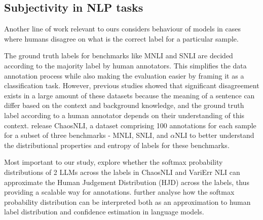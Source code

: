 

\subsection{Subjectivity in NLP tasks}
\label{related:subjectivity}
Another line of work relevant to ours considers behaviour of models in cases where humans disagree on what is the correct label for a particular sample. 

The ground truth labels for benchmarks like MNLI and SNLI are decided according to the majority label by human annotators. 
This simplifies the data annotation process while also making the evaluation easier by framing it as a classification task. 
However, previous studies \citep{pavlick-kwiatkowski-2019-inherent, nie-etal-2020-learn} showed that significant disagreement exists in a large amount of these datasets because the meaning of a sentence can differ based on the context and background knowledge, and the ground truth label according to a human annotator depends on their understanding of this context. 
\citet{nie-etal-2020-learn} release ChaosNLI, a dataset comprising 100 annotations for each sample for a subset of three benchmarks - MNLI, SNLI, and $\alpha$NLI to better understand the distributional properties and entropy of labels for these benchmarks.

Most important to our study, \citet{chen2024seeingbig} explore whether the softmax probability distributions of 2 LLMs across the labels in ChaosNLI \citep{nie-etal-2020-learn} and VariErr NLI \citep{weber-genzel-etal-2024-varierr} can approximate the Human Judgement Distribution (HJD) across the labels, thus providing a scalable way for annotations. \citet{baan-etal-2024-interpreting} further analyse how the softmax probability distribution can be interpreted both as an approximation to human label distribution and confidence estimation in language models.
